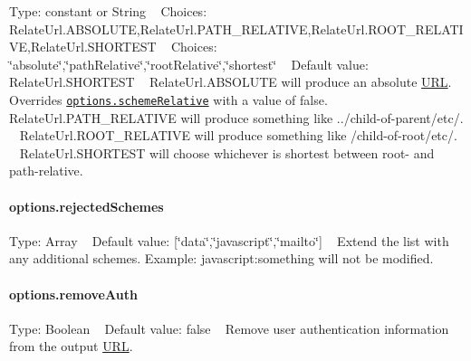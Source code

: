 Type\+: constant or {\ttfamily String} ~\newline
Choices\+: {\ttfamily Relate\+Url.\+A\+B\+S\+O\+L\+U\+TE},{\ttfamily Relate\+Url.\+P\+A\+T\+H\+\_\+\+R\+E\+L\+A\+T\+I\+VE},{\ttfamily Relate\+Url.\+R\+O\+O\+T\+\_\+\+R\+E\+L\+A\+T\+I\+VE},{\ttfamily Relate\+Url.\+S\+H\+O\+R\+T\+E\+ST} ~\newline
Choices\+: {\ttfamily \char`\"{}absolute\char`\"{}},{\ttfamily \char`\"{}path\+Relative\char`\"{}},{\ttfamily \char`\"{}root\+Relative\char`\"{}},{\ttfamily \char`\"{}shortest\char`\"{}} ~\newline
Default value\+: {\ttfamily Relate\+Url.\+S\+H\+O\+R\+T\+E\+ST} ~\newline
 {\ttfamily Relate\+Url.\+A\+B\+S\+O\+L\+U\+TE} will produce an absolute \mbox{\hyperlink{namespace_u_r_l}{U\+RL}}. Overrides \href{#options.schemeRelative}{\tt {\ttfamily options.\+scheme\+Relative}} with a value of {\ttfamily false}. ~\newline
{\ttfamily Relate\+Url.\+P\+A\+T\+H\+\_\+\+R\+E\+L\+A\+T\+I\+VE} will produce something like {\ttfamily ../child-\/of-\/parent/etc/}. ~\newline
{\ttfamily Relate\+Url.\+R\+O\+O\+T\+\_\+\+R\+E\+L\+A\+T\+I\+VE} will produce something like {\ttfamily /child-\/of-\/root/etc/}. ~\newline
{\ttfamily Relate\+Url.\+S\+H\+O\+R\+T\+E\+ST} will choose whichever is shortest between root-\/ and path-\/relative. ~\newline
 \paragraph*{options.\+rejected\+Schemes}

Type\+: {\ttfamily Array} ~\newline
Default value\+: {\ttfamily \mbox{[}\char`\"{}data\char`\"{},\char`\"{}javascript\char`\"{},\char`\"{}mailto\char`\"{}\mbox{]}} ~\newline
 Extend the list with any additional schemes. Example\+: {\ttfamily javascript\+:something} will not be modified.

\paragraph*{options.\+remove\+Auth}

Type\+: {\ttfamily Boolean} ~\newline
Default value\+: {\ttfamily false} ~\newline
 Remove user authentication information from the output \mbox{\hyperlink{namespace_u_r_l}{U\+RL}}.


